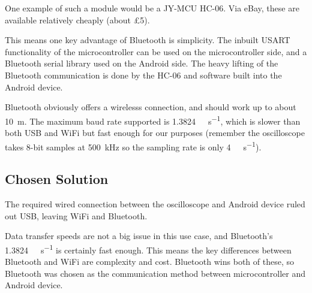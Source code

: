 One example of such a module would be a JY-MCU HC-06. Via eBay, these are
available relatively cheaply (about \pounds 5).

This means one key advantage of Bluetooth is simplicity. The inbuilt USART
functionality of the microcontroller can be used on the microcontroller side,
and a Bluetooth serial library used on the Android side. The heavy lifting of
the Bluetooth communication is done by the HC-06 and software built into the
Android device.

Bluetooth obviously offers a wirelesss connection, and should work up to about
\SI{10}{\m}. The maximum baud rate supported is
\SI{1.3824}{\mega\bit\per\second}, which is slower than both USB and WiFi but
fast enough for our purposes (remember the oscilloscope takes 8-bit samples at
\SI{500}{\kHz} so the sampling rate is only \SI{4}{\mega\bit\per\second}).

\subsection*{Chosen Solution}
The required wired connection between the oscilloscope and Android device ruled
out USB, leaving WiFi and Bluetooth.

Data transfer speeds are not a big issue in this use case, and Bluetooth's
\SI{1.3824}{\mega\bit\per\second} is certainly fast enough. This means the key
differences between Bluetooth and WiFi are complexity and cost. Bluetooth wins
both of these, so Bluetooth was chosen as the communication method between
microcontroller and Android device.
